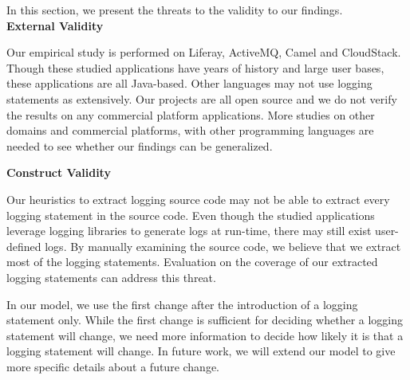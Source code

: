 In this section, we present the threats to the validity to our findings. \\


\noindent \textbf{External Validity}

Our empirical study is performed on Liferay, ActiveMQ, Camel and CloudStack. Though these studied applications have years of history and large user bases, these applications are all Java-based. Other languages may not use logging statements as extensively. Our projects are all open source and we do not verify the results on any commercial platform applications. More studies on other domains and commercial platforms, with other programming languages are needed to see whether our findings can be generalized. 



\noindent \textbf{Construct Validity}


Our heuristics to extract logging source code may not be able to extract every logging statement in the source code. Even though the studied applications leverage logging libraries to generate logs at run-time, there may still exist user-defined logs. By manually examining the source code, we believe that we extract most of the logging statements. Evaluation on the coverage of our extracted logging statements can address this threat.

In our model, we use the first change after the introduction of a logging statement only. While the first change is sufficient for deciding whether a logging statement will change, we need more information to decide how likely it is that a logging statement will change. In future work, we will extend our model to give more specific details about a future change.



